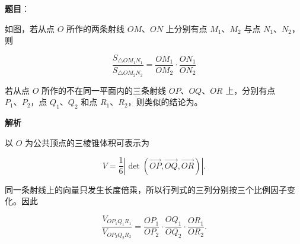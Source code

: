 \begin{answer}

\textbf{题目}：

如图，若从点 $O$ 所作的两条射线 $OM\text{、}ON$ 上分别有点 $M_1\text{、}M_2$ 与点 $N_1\text{、}N_2$，则

\nopagebreak[4]
\[
\frac{S_{\triangle OM_1N_1}}{S_{\triangle OM_2N_2}}
=\frac{OM_1}{OM_2}\cdot\frac{ON_1}{ON_2}
\]

若从点 $O$ 所作的不在同一平面内的三条射线 $OP\text{、}OQ\text{、}OR$ 上，分别有点 $P_1\text{、}P_2$，点 $Q_1\text{、}Q_2$ 和点 $R_1\text{、}R_2$，则类似的结论为\gkblank{}。
\nopagebreak[4]
\begin{center}\end{center}
\nopagebreak[4]
\textbf{解析}

以 $O$ 为公共顶点的三棱锥体积可表示为

\nopagebreak[4]
\[
V=\frac16\left|\det(\overrightarrow{OP},\overrightarrow{OQ},\overrightarrow{OR})\right|.
\]

同一条射线上的向量只发生长度倍乘，所以行列式的三列分别按三个比例因子变化。因此

\nopagebreak[4]
\[
\frac{V_{OP_1Q_1R_1}}{V_{OP_2Q_2R_2}}
=\frac{OP_1}{OP_2}\cdot\frac{OQ_1}{OQ_2}\cdot\frac{OR_1}{OR_2}.
\]


\end{answer}

